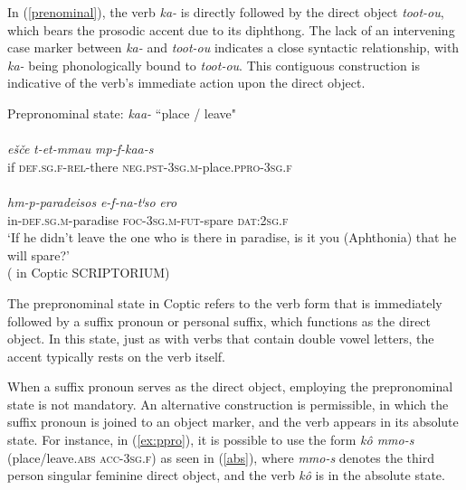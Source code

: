 \documentclass[output=paper,colorlinks,citecolor=brown ,chinesefont]{langscibook}
\begin{document}
In (\ref{prenominal}), the verb  \textit{ka-} is directly followed by the direct object  \textit{toot-ou}, which bears the prosodic accent due to its diphthong. The lack of an intervening case marker between  \textit{ka-} and  \textit{toot-ou} indicates a close syntactic relationship, with   \textit{ka-} being phonologically bound to  \textit{toot-ou}. This contiguous construction is indicative of the verb's immediate action upon the direct object.

\begin{exe}
    \ex\label{ex:ppro} Prepronominal state:  \textit{kaa-} “place / leave" \\
\glll {}			 \\
    \textit{ešče} 	\textit{t-et-mmau} 		\textit{mp-f-kaa-s} 			\\
if 	\textsc{def}.\textsc{sg}.\textsc{f}-\textsc{rel}-there 	\textsc{neg}.\textsc{pst}-3\textsc{sg}.\textsc{m}-place.\textsc{ppro}-3\textsc{sg}.\textsc{f}  \\

\glll {}   \\
\textit{hm-p-paradeisos} \textit{e-f-na-tⁱso}  \textit{ero} \\
in-\textsc{def}.\textsc{sg}.\textsc{m}-paradise \textsc{foc}-3\textsc{sg}.\textsc{m}-\textsc{fut}-spare \textsc{dat}:2\textsc{sg}.\textsc{f} \\

\glt ‘If he didn't leave the one who is there in paradise, is it you (Aphthonia) that he will spare?' \\
\hspace*{\fill}( in Coptic SCRIPTORIUM) 
\end{exe}

The prepronominal state in Coptic refers to the verb form that is immediately followed by a suffix pronoun or personal suffix, which functions as the direct object. In this state, just as with verbs that contain double vowel letters, the accent typically rests on the verb itself.

When a suffix pronoun serves as the direct object, employing the prepronominal state is not mandatory. An alternative construction is permissible, in which the suffix pronoun is joined to an object marker, and the verb appears in its absolute state. For instance, in (\ref{ex:ppro}), it is possible to use the form  \textit{kô mmo-s} (place/leave.\textsc{abs acc-3sg.f}) as seen in (\ref{abs}), where  \textit{mmo-s} denotes the third person singular feminine direct object, and the verb  \textit{kô} is in the absolute state.
\end{document}
